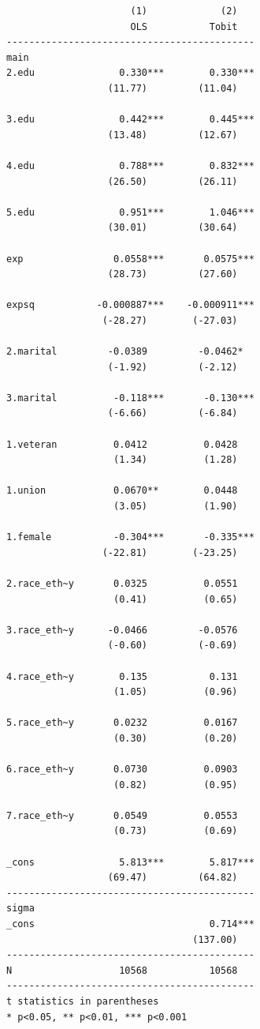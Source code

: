 \documentclass[
]{book}
\begin{document}
\begin{verbatim}
                      (1)             (2)   
                      OLS           Tobit   
--------------------------------------------
main                                        
2.edu               0.330***        0.330***
                  (11.77)         (11.04)   

3.edu               0.442***        0.445***
                  (13.48)         (12.67)   

4.edu               0.788***        0.832***
                  (26.50)         (26.11)   

5.edu               0.951***        1.046***
                  (30.01)         (30.64)   

exp                0.0558***       0.0575***
                  (28.73)         (27.60)   

expsq           -0.000887***    -0.000911***
                 (-28.27)        (-27.03)   

2.marital         -0.0389         -0.0462*  
                  (-1.92)         (-2.12)   

3.marital          -0.118***       -0.130***
                  (-6.66)         (-6.84)   

1.veteran          0.0412          0.0428   
                   (1.34)          (1.28)   

1.union            0.0670**        0.0448   
                   (3.05)          (1.90)   

1.female           -0.304***       -0.335***
                 (-22.81)        (-23.25)   

2.race_eth~y       0.0325          0.0551   
                   (0.41)          (0.65)   

3.race_eth~y      -0.0466         -0.0576   
                  (-0.60)         (-0.69)   

4.race_eth~y        0.135           0.131   
                   (1.05)          (0.96)   

5.race_eth~y       0.0232          0.0167   
                   (0.30)          (0.20)   

6.race_eth~y       0.0730          0.0903   
                   (0.82)          (0.95)   

7.race_eth~y       0.0549          0.0553   
                   (0.73)          (0.69)   

_cons               5.813***        5.817***
                  (69.47)         (64.82)   
--------------------------------------------
sigma                                       
_cons                               0.714***
                                 (137.00)   
--------------------------------------------
N                   10568           10568   
--------------------------------------------
t statistics in parentheses
* p<0.05, ** p<0.01, *** p<0.001
\end{verbatim}
\end{document}
